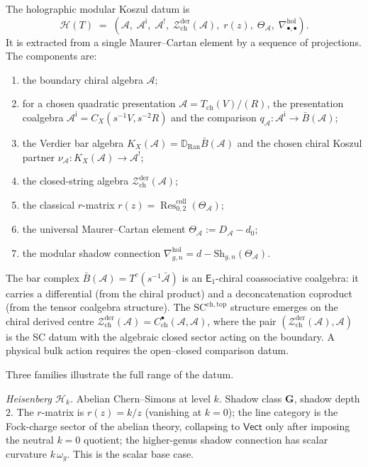 \documentclass[11pt,reqno]{amsart}
\theoremstyle{definition}
\theoremstyle{remark}
\newcommand{\cA}{\mathcal{A}}
\newcommand{\cH}{\mathcal{H}}
\newcommand{\cZ}{\mathcal{Z}}
\newcommand{\Ran}{\mathrm{Ran}}
\newcommand{\Eone}{\mathsf{E}_{1}}
\newcommand{\Sh}{\mathrm{Sh}}
\newcommand{\SCchtop}{\mathrm{SC}^{\mathrm{ch,top}}}
\newcommand{\barB}{\bar{B}}
\newcommand{\hol}{\mathrm{hol}}
\DeclareMathOperator{\Res}{Res}
\DeclareMathOperator{\coll}{coll}
\numberwithin{equation}{section}
\begin{document}
The holographic modular Koszul datum is
\begin{equation}\label{eq:datum-intro}
\cH(T) \;=\;
(\cA,\; \cA^{\mathrm{i}},\; \cA^!,\;
\cZ^{\mathrm{der}}_{\mathrm{ch}}(\cA),\; r(z),\;
\Theta_{\cA},\; \nabla^{\hol}_{\bullet,\bullet}).
\end{equation}
It is extracted from a single Maurer--Cartan element by a sequence of
projections. The components are:
\begin{enumerate}[label=(\roman*),nosep]
\item the boundary chiral algebra $\cA$;
\item for a chosen quadratic presentation
  $\cA=T_{\mathrm{ch}}(V)/(R)$, the presentation coalgebra
  $\cA^{\mathrm{i}}=C_X(s^{-1}V,s^{-2}R)$ and the comparison
  $q_\cA\colon\cA^{\mathrm i}\to\barB(\cA)$;
\item the Verdier bar algebra
  $K_X(\cA)=\mathbb D_{\Ran}\barB(\cA)$ and the chosen chiral
  Koszul partner $\nu_\cA\colon K_X(\cA)\to\cA^!$;
\item the closed-string algebra
  $\cZ^{\mathrm{der}}_{\mathrm{ch}}(\cA)$;
\item the classical $r$-matrix
  $r(z) = \Res^{\coll}_{0,2}(\Theta_{\cA})$;
\item the universal Maurer--Cartan element $\Theta_{\cA} := D_{\cA} - d_0$;
\item the modular shadow connection
  $\nabla^{\hol}_{g,n} = d - \Sh_{g,n}(\Theta_{\cA})$.
\end{enumerate}
The bar complex $\barB(\cA) = T^c(s^{-1}\bar{\cA})$ is an $\Eone$-chiral
coassociative coalgebra: it carries a differential (from the chiral
product) and a deconcatenation coproduct (from the tensor coalgebra
structure). The $\SCchtop$ structure emerges on the chiral derived centre
$\cZ^{\mathrm{der}}_{\mathrm{ch}}(\cA)
= C^\bullet_{\mathrm{ch}}(\cA,\cA)$, where the pair
$(\cZ^{\mathrm{der}}_{\mathrm{ch}}(\cA), \cA)$ is the SC datum
with the algebraic closed sector acting on the boundary. A physical
bulk action requires the open--closed comparison datum.

Three families illustrate the full range of the datum.

\smallskip
\noindent\emph{Heisenberg $\cH_k$.}\enspace
Abelian Chern--Simons at level $k$. Shadow class $\mathbf{G}$, shadow
depth $2$. The $r$-matrix is $r(z) = k/z$ (vanishing at $k=0$);
the line category is the Fock-charge sector of the abelian theory,
collapsing to $\mathsf{Vect}$ only after imposing the neutral
$k=0$ quotient; the higher-genus shadow connection has scalar
curvature \(k\,\omega_g\). This is the scalar base case.
\end{document}
